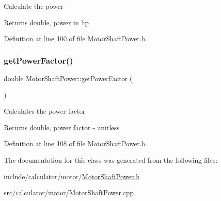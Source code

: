 Calculate the power \begin{DoxyReturn}{Returns}
double, power in hp 
\end{DoxyReturn}


Definition at line 100 of file Motor\+Shaft\+Power.\+h.

\mbox{\label{class_motor_shaft_power_aeb4d4a4a4f1317955908e214d61dbea7}} 
\subsubsection{\texorpdfstring{get\+Power\+Factor()}{getPowerFactor()}}
{\footnotesize\ttfamily double Motor\+Shaft\+Power\+::get\+Power\+Factor (\begin{DoxyParamCaption}{ }\end{DoxyParamCaption})\hspace{0.3cm}{\ttfamily [inline]}}

Calculates the power factor \begin{DoxyReturn}{Returns}
double, power factor -\/ unitless 
\end{DoxyReturn}


Definition at line 108 of file Motor\+Shaft\+Power.\+h.



The documentation for this class was generated from the following files\+:\begin{DoxyCompactItemize}
\item 
include/calculator/motor/\hyperlink{_motor_shaft_power_8h}{Motor\+Shaft\+Power.\+h}\item 
src/calculator/motor/Motor\+Shaft\+Power.\+cpp\end{DoxyCompactItemize}
